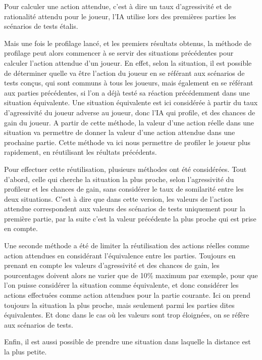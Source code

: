 \documentclass{report}
\begin{document}
\hspace{0.5cm}Pour calculer une action attendue, c'est à dire un taux d'agressivité et de rationalité attendu pour le joueur, l'IA utilise lors des premières parties les scénarios de tests étalis.\par
Mais une fois le profilage lancé, et les premiers résultats obtenus, la méthode de profilage peut alors commencer à se servir des situations précédentes pour calculer l'action attendue d'un joueur. En effet, selon la situation, il est possible de déterminer quelle va être l'action du joueur en se référant aux scénarios de tests conçus, qui sont communs à tous les joueurs, mais également en se référant aux parties précédentes, si l'on a déjà testé sa réaction précédemment dans une situation équivalente. Une situation équivalente est ici considérée à partir du taux d'agressivité du joueur adverse au joueur, donc l'IA qui profile, et des chances de gain du joueur. A partir de cette méthode, la valeur d'une action réelle dans une situation va permettre de donner la valeur d'une action attendue dans une prochaine partie. Cette méthode va ici nous permettre de profiler le joueur plus rapidement, en réutilisant les réultats précédents.\par
Pour effectuer cette réutilisation, plusieurs méthodes ont été considérées. Tout d'abord, celle qui cherche la situation la plus proche, selon l'agressivité du profileur et les chances de gain, sans considérer le taux de somilarité entre les deux situations. C'est à dire que dans cette version, les valeurs de l'action attendue correspondent aux valeurs des scénarios de tests uniquement pour la première partie, par la suite c'est la valeur précédente la plus proche qui est prise en compte.\par
Une seconde méthode a été de limiter la réutilisation des actions réelles comme action attendues en considérant l'équivalence entre les parties. Toujours en prenant en compte les valeurs d'agressivité et des chances de gain, les pourcentages doivent alors ne varier que de 10\% maximum par exemple, pour que l'on puisse considérer la situation comme équivalente, et donc considérer les actions effectuées comme action attendues pour la partie courante. Ici on prend toujours la situation la plus proche, mais seulement parmi les parties dites équivalentes. Et donc dans le cas où les valeurs sont trop éloignées, on se réfère aux scénarios de tests.\par
Enfin, il est aussi possible de prendre une situation dans laquelle la distance est la plus petite.
\end{document}
